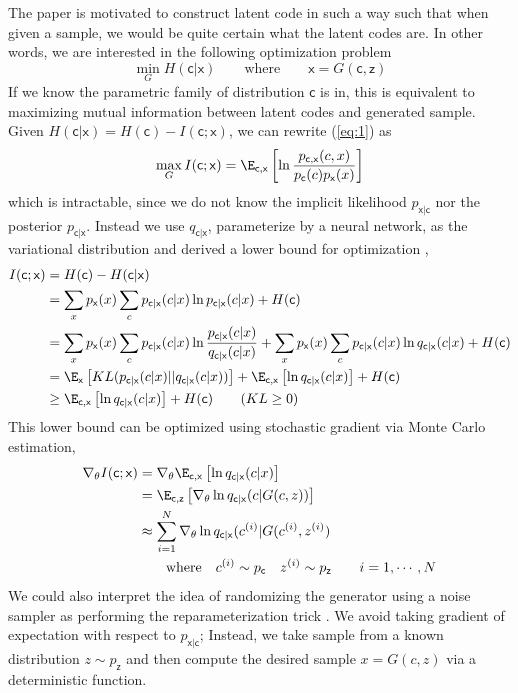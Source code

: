 \documentclass[11pt]{article}
\newcommand\rx{\ensuremath{\mathsf{x}}}
\newcommand\rc{\ensuremath{\mathsf{c}}}
\newcommand\rz{\ensuremath{\mathsf{z}}}
\begin{document}
The paper is motivated to construct latent code in such a way such that when given a sample, we would be quite certain what the latent codes are. In other words, we are interested in the following optimization problem 
\begin{equation}
    \label{eq:1}
    \min_{G} H(\rc|\rx) 
    \quad\quad \text{where}\quad\quad
    \rx = G(\rc,\rz)
\end{equation}
If we know the parametric family of distribution $\rc$ is in, this is equivalent to maximizing mutual information between latent codes and generated sample. Given $H(\rc|\rx) = H(\rc) - I(\rc;\rx)$, we can rewrite (\ref{eq:1}) as
\[
    \max_G I(\rc; \rx) 
        = \E_{\rc,\rx}\left[ \ln \frac{p_{\rc,\rx}(c,x) }{p_{\rc}(c) p_{\rx}(x)} \right]
\]
which is intractable, since we do not know the implicit likelihood $p_{\rx|\rc}$ nor the posterior $p_{\rc|\rx}$. Instead we use $q_{\rc|\rx}$, parameterize by a neural network, as the variational distribution and derived a lower bound for optimization \cite{barberIMAlgorithmVariational2003,pooleVariationalBoundsMutual2019},
\begin{align*}
    I(\rc;\rx)
        &= H(\rc) - H(\rc|\rx) \\
        &= \sum_{x} p_{\rx}(x) \sum_{c} p_{\rc|\rx}(c|x) \ln p_{\rc|\rx}(c|x) + H(\rc) \\
        &= \sum_{x} p_{\rx}(x) \sum_{c} p_{\rc|\rx}(c|x) \ln \frac{p_{\rc|\rx}(c|x)}{q_{\rc|\rx}(c|x)} + \sum_{x} p_{\rx}(x) \sum_{c} p_{\rc|\rx}(c|x) \ln q_{\rc|\rx}(c|x) + H(\rc) \\
        &= \E_{\rx} \left[ KL(p_{\rc|\rx}(c|x) || q_{\rc|\rx}(c|x)) \right] + \E_{\rc,\rx} \left[ \ln q_{\rc|\rx}(c|x) \right] + H(\rc) \\
        &\geq  \E_{\rc,\rx} \left[ \ln q_{\rc|\rx}(c|x) \right] + H(\rc)  \tag{$KL \geq 0$}
\end{align*}
This lower bound can be optimized using stochastic gradient via Monte Carlo estimation,
\begin{align*}
    \nabla_{\theta} I(\rc;\rx) 
        &= \nabla_{\theta} \E_{\rc,\rx} \left[ \ln q_{\rc|\rx}(c|x) \right] \\
        &= \E_{\rc,\rz} \left[ \nabla_{\theta} \ln q_{\rc|\rx}(c|G(c,z)) \right] \\
        &\approx \sum_{i=1}^N  \nabla_{\theta} \ln q_{\rc|\rx}(c^{(i)}|G(c^{(i)},z^{(i)}) \\
        &\quad\quad\text{where} \quad c^{(i)} \sim p_{\rc} \quad z^{(i)} \sim p_{\rz} \quad\quad i=1,\cdots,N
\end{align*}
We could also interpret the idea of randomizing the generator using a noise sampler as performing the reparameterization trick \cite{kingmaAutoEncodingVariationalBayes2014}. We avoid taking gradient of expectation with respect to $p_{\rx|\rc}$; Instead, we take sample from a known distribution $z\sim p_{\rz}$ and then compute the desired sample $x = G(c,z)$ via a deterministic function.

\printbibliography 
\end{document}
